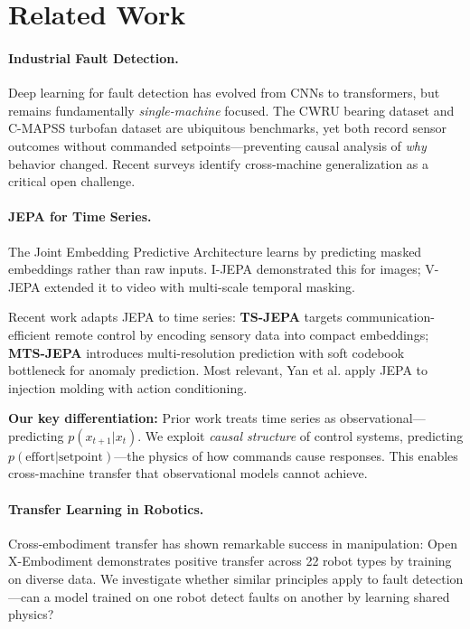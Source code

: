\documentclass{article}
\begin{document}
\section{Related Work}

\paragraph{Industrial Fault Detection.} Deep learning for fault detection has evolved from CNNs to transformers, but remains fundamentally \emph{single-machine} focused. The CWRU bearing dataset \cite{cwru} and C-MAPSS turbofan dataset \cite{cmapss} are ubiquitous benchmarks, yet both record sensor outcomes without commanded setpoints—preventing causal analysis of \emph{why} behavior changed. Recent surveys \cite{} identify cross-machine generalization as a critical open challenge.

\paragraph{JEPA for Time Series.} The Joint Embedding Predictive Architecture \cite{lecun2022path} learns by predicting masked embeddings rather than raw inputs. I-JEPA \cite{ijepa} demonstrated this for images; V-JEPA \cite{vjepa} extended it to video with multi-scale temporal masking.

Recent work adapts JEPA to time series: \textbf{TS-JEPA} \cite{tsjepa} targets communication-efficient remote control by encoding sensory data into compact embeddings; \textbf{MTS-JEPA} \cite{mtsjepa} introduces multi-resolution prediction with soft codebook bottleneck for anomaly prediction. Most relevant, Yan et al. \cite{yan2025industrial} apply JEPA to injection molding with action conditioning.

\textbf{Our key differentiation:} Prior work treats time series as observational—predicting $p(x_{t+1}|x_t)$. We exploit \emph{causal structure} of control systems, predicting $p(\text{effort}|\text{setpoint})$—the physics of how commands cause responses. This enables cross-machine transfer that observational models cannot achieve.

\paragraph{Transfer Learning in Robotics.} Cross-embodiment transfer has shown remarkable success in manipulation: Open X-Embodiment \cite{openx} demonstrates positive transfer across 22 robot types by training on diverse data. We investigate whether similar principles apply to fault detection—can a model trained on one robot detect faults on another by learning shared physics?
\end{document}
